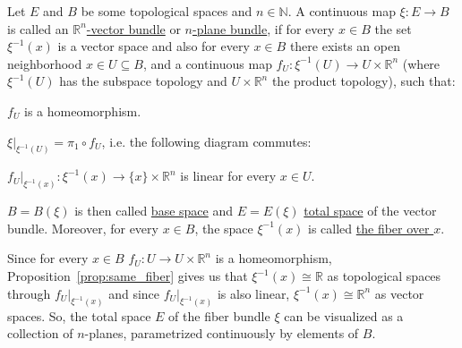 \begin{definition}\label{def:vector_bundle} Let $E$ and $B$ be some topological spaces and $n\in\mathbb{N}$. A continuous map $\xi:E\to B$ is called an \ul{$\mathbb{R}^n$-vector bundle} or \ul{$n$-plane bundle}, if for every $x\in B$ the set $\xi^{-1}(x)$ is a vector space and also for every $x\in B$ there exists an open neighborhood $x\in U\subseteq B$, and a continuous map $f_U:\xi^{-1}(U)\to U\times\mathbb{R}^n$ (where $\xi^{-1}(U)$ has the subspace topology and $U\times\mathbb{R}^n$ the product topology), such that:
\begin{i_enum}
\item $f_U$ is a homeomorphism.
\item  $\xi|_{\xi^{-1}(U)}=\pi_1\circ f_U$, i.e. the following diagram commutes:
\begin{center}
\end{center}
\item $f_U|_{\xi^{-1}(x)}:\xi^{-1}(x)\to\{x\}\times\mathbb{R}^n$ is linear for every $x\in U$.
\end{i_enum}
$B=B(\xi)$ is then called \ul{base space} and $E=E(\xi)$ \ul{total space} of the vector bundle. Moreover, for every $x\in B$, the space $\xi^{-1}(x)$ is called \ul{the fiber over $x$}.
\end{definition}
\begin{remark} Since for every $x\in B$ $f_U:U\to U\times\mathbb{R}^n$ is a homeomorphism, Proposition~\ref{prop:same_fiber} gives us that $\xi^{-1}(x)\cong\mathbb{R}$ as topological spaces through $f_U|_{\xi^{-1}(x)}$ and since $f_U|_{\xi^{-1}(x)}$ is also linear, $\xi^{-1}(x)\cong\mathbb{R}^n$ as vector spaces. So, the total space $E$ of the fiber bundle $\xi$ can be visualized as a collection of $n$-planes, parametrized continuously by elements of $B$.
\end{remark}


